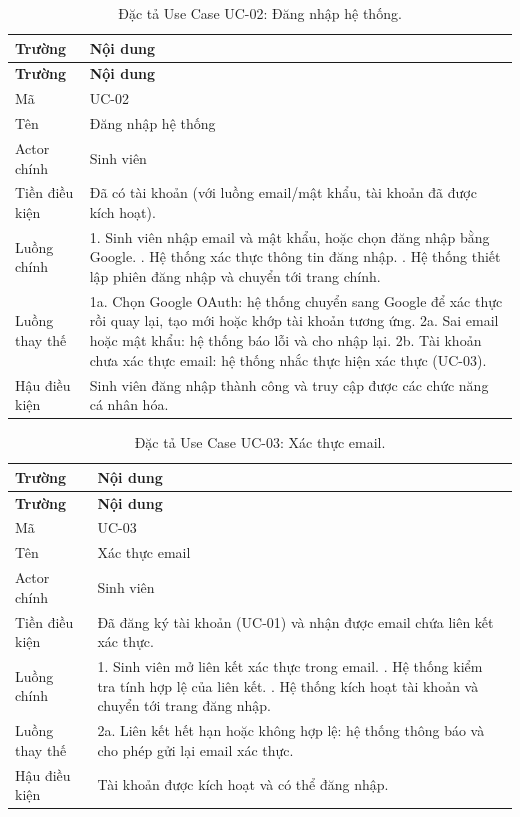 \begin{longtable}{|L{3.5cm}|L{10cm}|}
\caption{Đặc tả Use Case UC-02: Đăng nhập hệ thống.}
\label{tab:uc02} \\
\hline
\textbf{Trường} & \textbf{Nội dung} \\
\hline
\endfirsthead
\hline
\textbf{Trường} & \textbf{Nội dung} \\
\hline
\endhead
Mã & UC-02 \\
\hline
Tên & Đăng nhập hệ thống \\
\hline
Actor chính & Sinh viên \\
\hline
Tiền điều kiện & Đã có tài khoản (với luồng email/mật khẩu, tài khoản đã được kích hoạt). \\
\hline
Luồng chính & 1. Sinh viên nhập email và mật khẩu, hoặc chọn đăng nhập bằng Google. . Hệ thống xác thực thông tin đăng nhập. . Hệ thống thiết lập phiên đăng nhập và chuyển tới trang chính. \\
\hline
Luồng thay thế & 1a. Chọn Google OAuth: hệ thống chuyển sang Google để xác thực rồi quay lại, tạo mới hoặc khớp tài khoản tương ứng. \newline 2a. Sai email hoặc mật khẩu: hệ thống báo lỗi và cho nhập lại. \newline 2b. Tài khoản chưa xác thực email: hệ thống nhắc thực hiện xác thực (UC-03). \\
\hline
Hậu điều kiện & Sinh viên đăng nhập thành công và truy cập được các chức năng cá nhân hóa. \\
\hline
\end{longtable}

\begin{longtable}{|L{3.5cm}|L{10cm}|}
\caption{Đặc tả Use Case UC-03: Xác thực email.}
\label{tab:uc03} \\
\hline
\textbf{Trường} & \textbf{Nội dung} \\
\hline
\endfirsthead
\hline
\textbf{Trường} & \textbf{Nội dung} \\
\hline
\endhead
Mã & UC-03 \\
\hline
Tên & Xác thực email \\
\hline
Actor chính & Sinh viên \\
\hline
Tiền điều kiện & Đã đăng ký tài khoản (UC-01) và nhận được email chứa liên kết xác thực. \\
\hline
Luồng chính & 1. Sinh viên mở liên kết xác thực trong email. . Hệ thống kiểm tra tính hợp lệ của liên kết. . Hệ thống kích hoạt tài khoản và chuyển tới trang đăng nhập. \\
\hline
Luồng thay thế & 2a. Liên kết hết hạn hoặc không hợp lệ: hệ thống thông báo và cho phép gửi lại email xác thực. \\
\hline
Hậu điều kiện & Tài khoản được kích hoạt và có thể đăng nhập. \\
\hline
\end{longtable}

